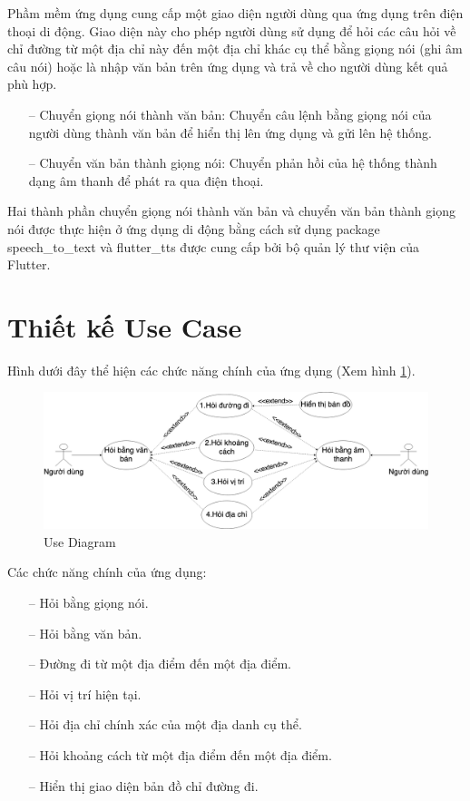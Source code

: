 Phầm mềm ứng dụng cung cấp một giao diện người dùng qua ứng dụng trên điện thoại di động. Giao diện này cho phép người dùng sử dụng để hỏi các câu hỏi về chỉ đường từ một địa chỉ này đến một địa chỉ khác cụ thể bằng giọng nói (ghi âm câu nói) hoặc là nhập văn bản trên ứng dụng và trả về cho người dùng kết quả phù hợp.
\begin{itemize}
    \item[--] Chuyển giọng nói thành văn bản: Chuyển câu lệnh bằng giọng nói của người dùng thành văn bản để hiển thị lên ứng dụng và gửi lên hệ thống.
    \item[--] Chuyển văn bản thành giọng nói: Chuyển phản hồi của hệ thống thành dạng âm thanh để phát ra qua điện thoại.
\end{itemize}

Hai thành phần chuyển giọng nói thành văn bản và chuyển văn bản thành giọng nói được thực hiện ở ứng dụng di động bằng cách sử dụng package speech\_to\_text\cite{stt} và flutter\_tts\cite{tts} được cung cấp bởi bộ quản lý thư viện của Flutter.

\section{Thiết kế Use Case}
Hình dưới đây thể hiện các chức năng chính của ứng dụng (Xem hình \ref{fig:UC}). 
\begin{figure}[H]
    \centering
    \includegraphics[width=15cm]{images/ChatbotSRS-UseCase.png}
    \caption{Use Diagram}
    \label{fig:UC}
\end{figure}

Các chức năng chính của ứng dụng:
\begin{itemize}
    \item[--] Hỏi bằng giọng nói. 
    \item[--] Hỏi bằng văn bản.
    \item[--] Đường đi từ một địa điểm đến một địa điểm.
    \item[--] Hỏi vị trí hiện tại.
    \item[--] Hỏi địa chỉ chính xác của một địa danh cụ thể.
    \item[--] Hỏi khoảng cách từ một địa điểm đến một địa điểm.
    \item[--] Hiển thị giao diện bản đồ chỉ đường đi. 
\end{itemize}

